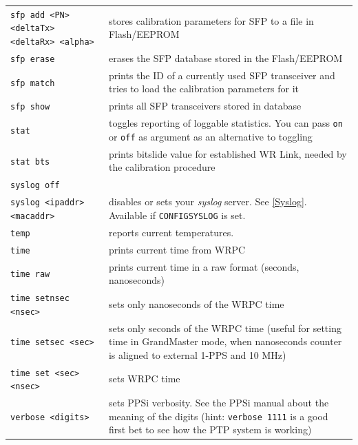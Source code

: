 \documentclass[a4paper, 12pt]{article}
\renewcommand{\_}{\underscore\allowbreak}
\newcommand{\code}[1]{\texttt{#1}}
\begin{document}
\begin{longtable}{  p{7.5cm}  p{7cm} }
  \code{sfp add <PN> <deltaTx> <deltaRx> <alpha>} & stores calibration
    parameters for SFP to a file in Flash/EEPROM \\

  \code{sfp erase} & erases the SFP database stored in the Flash/EEPROM \\

  \code{sfp match} & prints the ID of a currently used SFP transceiver and
    tries to load the calibration parameters for it \\

  \code{sfp show} & prints all SFP transceivers stored in database \\

  \code{stat} & toggles reporting of loggable statistics. You can pass
    \texttt{on} or \texttt{off} as argument as an alternative to toggling \\

  \code{stat bts} & prints bitslide value for established WR Link, needed by
    the calibration procedure \\

  \code{syslog off} &  \\
  \code{syslog <ipaddr> <macaddr>} & disables or sets your \textit{syslog}
    server. See \ref{Syslog}. Available if \texttt{CONFIG\_SYSLOG} is set. \\

  \code{temp} & reports current temperatures. \\

  \code{time} & prints current time from WRPC \\

  \code{time raw} &  prints current time in a raw format (seconds, nanoseconds) \\

  \code{time setnsec <nsec>} & sets only nanoseconds of the WRPC time \\

  \code{time setsec <sec>} & sets only seconds of the WRPC time (useful for
    setting time in GrandMaster mode, when nanoseconds counter is aligned to
    external 1-PPS and 10 MHz) \\

  \code{time set <sec> <nsec>} & sets WRPC time \\

  \code{verbose <digits>} & sets PPSi verbosity. See the PPSi manual about the
    meaning of the digits (hint: \texttt{verbose 1111} is a good first bet to
    see how the PTP system is working)  \\


\end{longtable}
\end{document}
